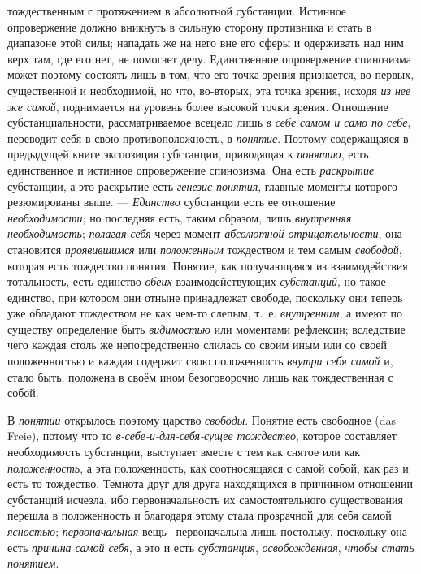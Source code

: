 \documentclass[twoside]{article}
\begin{document}
{{тождественным с протяжением в абсолютной субстанции. Истинное опровержение
должно вникнуть в сильную сторону противника и стать в
диапазоне этой силы; нападать же на него вне его сферы и одерживать над ним
верх там, где его нет, не помогает делу. Единственное опровержение
спинозизма может поэтому состоять лишь в том, что его точка зрения
признается, во-первых, существенной и необходимой, но что, во-вторых, эта
точка зрения, исходя {\em из нее же самой}, поднимается на уровень более 
высокой точки зрения. Отношение субстанциальности, рассматриваемое всецело 
лишь {\em в себе самом и само по себе}, переводит себя в свою 
противоположность, в {\em понятие}. Поэтому содержащаяся в предыдущей книге 
экспозиция субстанции, приводящая к {\em понятию}, есть единственное и 
истинное опровержение спинозизма. Она есть {\em раскрытие} субстанции, а это 
раскрытие есть {\em генезис понятия}, главные моменты которого резюмированы 
выше. — {\em Единство} субстанции есть ее отношение {\em необходимости};
но последняя есть, таким образом, лишь {\em внутренняя необходимость};
{\em полагая себя} через момент {\em абсолютной отрицательности}, она 
становится {\em проявившимся} или {\em положенным} тождеством и тем самым
{\em свободой}, которая есть тождество понятия. Понятие, как получающаяся из 
взаимодействия тотальность, есть единство {\em обеих} взаимодействующих
{\em субстанций}, но такое единство, при котором они отныне принадлежат 
свободе, поскольку они теперь уже обладают тождеством не как чем-то слепым, 
т.~е. {\em внутренним}, а имеют по существу определение быть {\em видимостью} 
или моментами рефлексии; вследствие чего каждая столь же непосредственно
слилась со своим иным или со своей положенностью и каждая содержит свою
положенность {\em внутри себя самой} и, стало быть, положена в своём ином 
безоговорочно лишь как тождественная с собой.

В {\em понятии} открылось поэтому царство {\em свободы}. Понятие есть 
свободное (das Freie), потому что то {\em в-себе-и-для-себя-сущее тождество}, 
которое составляет необходимость субстанции, выступает вместе с тем как 
снятое или как {\em положенность}, а эта положенность, как соотносящаяся с 
самой собой, как раз и есть то тождество. Темнота друг для друга находящихся 
в причинном отношении субстанций исчезла, ибо первоначальность их 
самостоятельного существования перешла в положенность и благодаря этому 
стала прозрачной для себя самой {\em ясностью}; {\em первоначальная}
вещь~\label{bkm:bm05}
первоначальна лишь постольку, поскольку она есть {\em причина самой себя},
а это и есть {\em субстанция}, {\em освобожденная}, {\em чтобы стать понятием}.

}}
\end{document}
